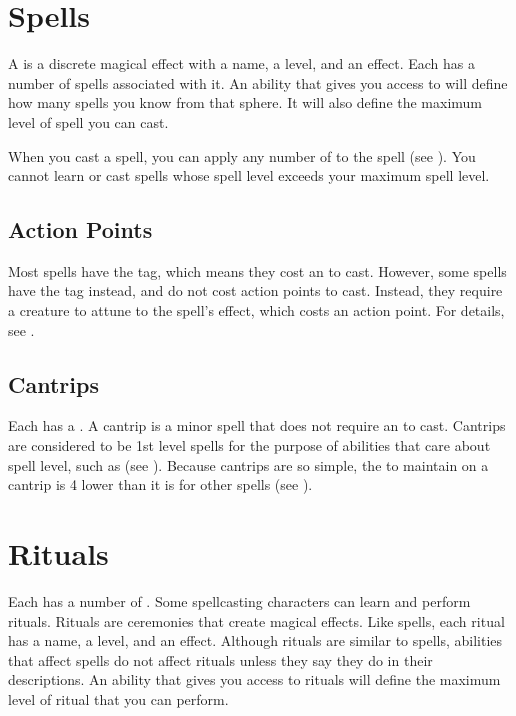 \section{Spells}\label{Spells}
    A  is a discrete magical effect with a name, a level, and an effect.
    Each  has a number of spells associated with it.
    An ability that gives you access to  will define how many spells you know from that sphere.
    It will also define the maximum level of spell you can cast.

    When you cast a spell, you can apply any number of  to the spell (see ).
    You cannot learn or cast spells whose spell level exceeds your maximum spell level.

    \subsection{Action Points}
        Most spells have the  tag, which means they cost an  to cast.
        However, some spells have the  tag instead, and do not cost action points to cast.
        Instead, they require a creature to attune to the spell's effect, which costs an action point.
        For details, see .

    \subsection{Cantrips}\label{Cantrips}
        Each  has a .
        A cantrip is a minor spell that does not require an  to cast.
        Cantrips are considered to be 1st level spells for the purpose of abilities that care about spell level, such as  (see ).
        Because cantrips are so simple, the  to maintain  on a cantrip is 4 lower than it is for other spells (see ).

\section{Rituals}\label{Rituals}
    Each  has a number of .
    Some spellcasting characters can learn and perform rituals.
    Rituals are ceremonies that create magical effects.
    Like spells, each ritual has a name, a level, and an effect.
    Although rituals are similar to spells, abilities that affect spells do not affect rituals unless they say they do in their descriptions.
    An ability that gives you access to rituals will define the maximum level of ritual that you can perform.

